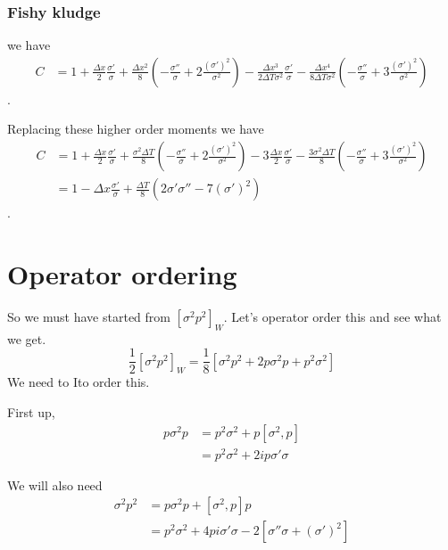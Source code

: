\subsubsection{Fishy kludge}
 we have
\begin{align}
C &= 1 +\frac{\Delta x}{2}\frac{\sigma'}{\sigma} + \frac{\Delta x^2}{8}\left(-\frac{\sigma''}{\sigma} + 2\frac{(\sigma')^2}{\sigma^2}\right) - \frac{\Delta x^3}{2\Delta T\sigma^2}\frac{\sigma'}{\sigma} - \frac{\Delta x^4}{8\Delta T\sigma^2}\left(-\frac{\sigma''}{\sigma} + 3\frac{(\sigma')^2}{\sigma^2}\right)
\end{align}.

Replacing these higher order moments we have
\begin{align}
C &= 1 +\frac{\Delta x}{2}\frac{\sigma'}{\sigma} + \frac{\sigma^2\Delta T}{8}\left(-\frac{\sigma''}{\sigma} + 2\frac{(\sigma')^2}{\sigma^2}\right) - 3\frac{\Delta x}{2}\frac{\sigma'}{\sigma} - \frac{3\sigma^2\Delta T}{8}\left(-\frac{\sigma''}{\sigma} + 3\frac{(\sigma')^2}{\sigma^2}\right)\\
&= 1 -\Delta x\frac{\sigma'}{\sigma}  + \frac{\Delta T}{8}\left(2\sigma'\sigma'' - 7(\sigma')^2\right)
\end{align}.

\section{Operator ordering}

So we must have started from $[\sigma^2p^2]_W$.  Let's operator order this and see what we get.  
\begin{equation}
\frac{1}{2}[\sigma^2p^2]_W = \frac{1}{8}[\sigma^2p^2 + 2p\sigma^2 p + p^2\sigma^2]
\end{equation}
We need to Ito order this.  

First up,
\begin{align}
p\sigma^2 p & = p^2\sigma^2 + p[\sigma^2,p]\\
& = p^2\sigma^2 + 2ip\sigma'\sigma
\end{align}

We will also need 
\begin{align}
\sigma^2 p ^2 &= p\sigma^2p + [\sigma^2,p]p\\
&= p^2\sigma^2 + 4pi\sigma'\sigma -2\left[\sigma''\sigma+(\sigma')^2\right]
\end{align}

